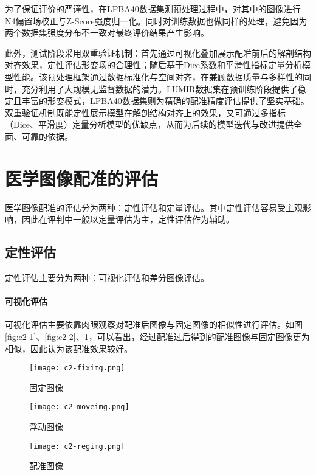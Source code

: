 为了保证评价的严谨性，在LPBA40数据集测预处理过程中，对其中的图像进行N4偏置场校正与Z-Score强度归一化。同时对训练数据也做同样的处理，避免因为两个数据集强度分布不一致对最终评价结果产生影响。

此外，测试阶段采用双重验证机制：首先通过可视化叠加展示配准前后的解剖结构对齐效果，定性评估形变场的合理性；随后基于Dice系数和平滑性指标定量分析模型性能。该预处理框架通过数据标准化与空间对齐，在兼顾数据质量与多样性的同时，充分利用了大规模无监督数据的潜力。LUMIR数据集在预训练阶段提供了稳定且丰富的形变模式，LPBA40数据集则为精确的配准精度评估提供了坚实基础。双重验证机制既能定性展示模型在解剖结构对齐上的效果，又可通过多指标（Dice、平滑度）定量分析模型的优缺点，从而为后续的模型迭代与改进提供全面、可靠的依据。

\section{医学图像配准的评估}

医学图像配准的评估分为两种：定性评估和定量评估。其中定性评估容易受主观影响，因此在评判中一般以定量评估为主，定性评估作为辅助。

\subsection{定性评估}

定性评估主要分为两种：可视化评估和差分图像评估。

\paragraph{可视化评估}

可视化评估主要依靠肉眼观察对配准后图像与固定图像的相似性进行评估。如图\ref{fig:c2-1}、\ref{fig:c2-2}、\ref{fig:c2-3}，可以看出，经过配准过后得到的配准图像与固定图像更为相似，因此认为该配准效果较好。

\begin{figure}[h]
    \centering
    \begin{minipage}{0.3\textwidth}
        \texttt{[image: c2-fiximg.png]}
        \caption{固定图像}
        \label{fig:c2-1}
    \end{minipage}
    \begin{minipage}{0.3\textwidth}
        \texttt{[image: c2-moveimg.png]}
        \caption{浮动图像}
        \label{fig:c2-2}
    \end{minipage}
    \begin{minipage}{0.3\textwidth}
        \texttt{[image: c2-regimg.png]}
        \caption{配准图像}
        \label{fig:c2-3}
    \end{minipage}
\end{figure}

